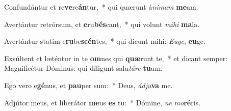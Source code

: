 \item Confundántur et re\textbf{ve}re\textbf{án}tur,~* qui quærunt á\textit{ni}\textit{mam} \textbf{me}am.
\item Avertántur retrórsum, et \textbf{e}ru\textbf{bés}cant,~* qui volunt \textit{mi}\textit{hi} \textbf{ma}la.
\item Avertántur statim e\textbf{ru}be\textbf{scén}tes,~* qui dicunt mihi: \textit{Eu}\textit{ge}, \textbf{eu}ge.
\item Exsúltent et læténtur in te \textbf{om}nes qui \textbf{quæ}runt te,~* et dicant semper: Magnificétur Dóminus: qui díligunt salu\textit{tá}\textit{re} \textbf{tu}um.
\item Ego vero e\textbf{gé}nus, et \textbf{pau}per sum:~* Deus, \textit{ád}\textit{ju}\textbf{va} me.
\item Adjútor meus, et liberátor \textbf{me}us \textbf{es} tu:~* Dómine, \textit{ne} \textit{mo}\textbf{ré}ris.
